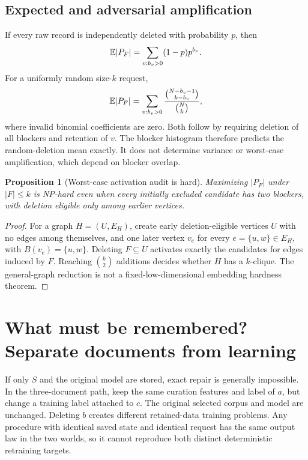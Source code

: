 \documentclass[11pt,a4paper]{article}
\newtheorem{proposition}[theorem]{Proposition}
\theoremstyle{definition}\newtheorem{definition}[theorem]{Definition}
\begin{document}
\subsection{Expected and adversarial amplification}
If every raw record is independently deleted with probability $p$, then
\begin{equation}
 \mathbb E|P_F|=\sum_{v:b_v>0}(1-p)p^{b_v}.
\end{equation}
For a uniformly random size-$k$ request,
\begin{equation}
 \mathbb E|P_F|=\sum_{v:b_v>0}
 \frac{\binom{N-b_v-1}{k-b_v}}{\binom Nk},
\end{equation}
where invalid binomial coefficients are zero. Both follow by requiring deletion of all blockers and retention of $v$. The blocker histogram therefore predicts the random-deletion mean exactly. It does not determine variance or worst-case amplification, which depend on blocker overlap.

\begin{proposition}[Worst-case activation audit is hard]
Maximizing $|P_F|$ under $|F|\le k$ is NP-hard even when every initially excluded candidate has two blockers, with deletion eligible only among earlier vertices.
\end{proposition}
\begin{proof}
For a graph $H=(U,E_H)$, create early deletion-eligible vertices $U$ with no edges among themselves, and one later vertex $v_e$ for every $e=\{u,w\}\in E_H$, with $B(v_e)=\{u,w\}$. Deleting $F\subseteq U$ activates exactly the candidates for edges induced by $F$. Reaching $\binom k2$ additions decides whether $H$ has a $k$-clique. The general-graph reduction is not a fixed-low-dimensional embedding hardness theorem.
\end{proof}

\section{What must be remembered? Separate documents from learning}
If only $S$ and the original model are stored, exact repair is generally impossible. In the three-document path, keep the same curation features and label of $a$, but change a training label attached to $c$. The original selected corpus and model are unchanged. Deleting $b$ creates different retained-data training problems. Any procedure with identical saved state and identical request has the same output law in the two worlds, so it cannot reproduce both distinct deterministic retraining targets.
\end{document}
